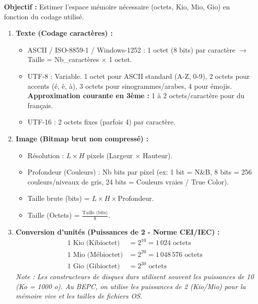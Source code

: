 \documentclass[11pt]{article}
\newcommand{\cle}[1]{{\popxbold\color{popdark}#1}}
\begin{document}
\begin{methode}
    \textbf{Objectif :} Estimer l'espace mémoire nécessaire (octets, Kio, Mio, Gio) en fonction du codage utilisé.
    \begin{enumerate}
        \item \textbf{Texte (Codage caractères) :}
        \begin{itemize}
            \item \cle{ASCII / ISO-8859-1 / Windows-1252} : 1 octet (8 bits) par caractère $\to$ Taille = Nb\_caractères $\times$ 1 octet.
            \item \cle{UTF-8} : Variable. 1 octet pour ASCII standard (A-Z, 0-9), 2 octets pour accents (é, è, à), 3 octets pour sinogrammes/arabes, 4 pour émojis. \textbf{Approximation courante en 3ème :} 1 à 2 octets/caractère pour du français.
            \item \cle{UTF-16} : 2 octets fixes (parfois 4) par caractère.
        \end{itemize}
        \item \textbf{Image (Bitmap brut non compressé) :}
        \begin{itemize}
            \item Résolution : $L \times H$ pixels (Largeur $\times$ Hauteur).
            \item Profondeur (Couleurs) : Nb bits par pixel (ex: 1 bit = N\&B, 8 bits = 256 couleurs/niveaux de gris, 24 bits = Couleurs vraies / \cle{True Color}).
            \item Taille brute (bits) = $L \times H \times \text{Profondeur}$.
            \item Taille (Octets) = $\frac{\text{Taille (bits)}}{8}$.
        \end{itemize}
        \item \textbf{Conversion d'unités (Puissances de 2 - Norme CEI/IEC) :}
        \begin{align*}
        1 \text{ Kio (Kibioctet)} &= 2^{10} = 1\,024 \text{ octets} \\
        1 \text{ Mio (Mébioctet)} &= 2^{20} = 1\,048\,576 \text{ octets} \\
        1 \text{ Gio (Gibioctet)} &= 2^{30} \text{ octets}
        \end{align*}
        \emph{Note : Les constructeurs de disques durs utilisent souvent les puissances de 10 (Ko = 1000 o). Au BEPC, on utilise les puissances de 2 (Kio/Mio) pour la mémoire vive et les tailles de fichiers OS.}
    \end{enumerate}
\end{methode}
\end{document}
